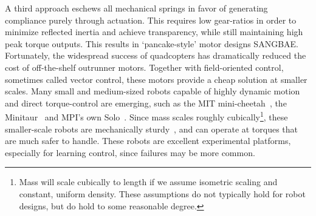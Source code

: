\par
A third approach eschews all mechanical springs in favor of generating compliance purely through actuation. This requires low gear-ratios in order to minimize reflected inertia and achieve transparency, while still maintaining high peak torque outputs. This results in `pancake-style' motor designs SANGBAE.
Fortunately, the widespread success of quadcopters has dramatically reduced the cost of off-the-shelf outrunner motors. Together with field-oriented control, sometimes called vector control, these motors provide a cheap solution at smaller scales. Many small and medium-sized robots capable of highly dynamic motion and direct torque-control are emerging, such as the MIT mini-cheetah~\cite{katz2019mini}, the Minitaur~\cite{kenneally2016design} and MPI's own Solo~\cite{grimminger2019open}. Since mass scales roughly cubically\footnote{Mass will scale cubically to length if we assume isometric scaling and constant, uniform density. These assumptions do not typically hold for robot designs, but do hold to some reasonable degree.}, these smaller-scale robots are mechanically sturdy~\cite{biewener2005biomechanical}, and can operate at torques that are much safer to handle. These robots are excellent experimental platforms, especially for learning control, since failures may be more common.







